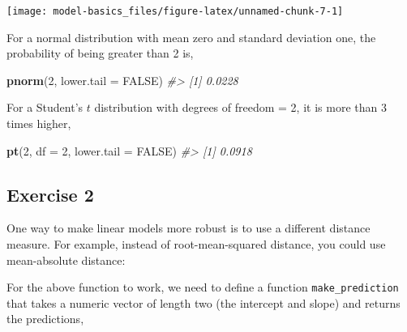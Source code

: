 \documentclass[]{book}
\newenvironment{Shaded}{\begin{snugshade}}{\end{snugshade}}
\newcommand{\CommentTok}[1]{\textcolor[rgb]{0.56,0.35,0.01}{\textit{#1}}}
\newcommand{\ControlFlowTok}[1]{\textcolor[rgb]{0.13,0.29,0.53}{\textbf{#1}}}
\newcommand{\DataTypeTok}[1]{\textcolor[rgb]{0.13,0.29,0.53}{#1}}
\newcommand{\DecValTok}[1]{\textcolor[rgb]{0.00,0.00,0.81}{#1}}
\newcommand{\KeywordTok}[1]{\textcolor[rgb]{0.13,0.29,0.53}{\textbf{#1}}}
\newcommand{\NormalTok}[1]{#1}
\newcommand{\OperatorTok}[1]{\textcolor[rgb]{0.81,0.36,0.00}{\textbf{#1}}}
\newcommand{\OtherTok}[1]{\textcolor[rgb]{0.56,0.35,0.01}{#1}}
\newcommand{\StringTok}[1]{\textcolor[rgb]{0.31,0.60,0.02}{#1}}
\theoremstyle{definition}
\theoremstyle{definition}
\theoremstyle{definition}
\theoremstyle{remark}
\begin{document}
\begin{center}\texttt{[image: model-basics\_files/figure-latex/unnamed-chunk-7-1]} \end{center}

For a normal distribution with mean zero and standard deviation one, the
probability of being greater than 2 is,

\begin{Shaded}
\begin{Highlighting}[]
\KeywordTok{pnorm}\NormalTok{(}\DecValTok{2}\NormalTok{, }\DataTypeTok{lower.tail =} \OtherTok{FALSE}\NormalTok{)}
\CommentTok{#> [1] 0.0228}
\end{Highlighting}
\end{Shaded}

For a Student's \(t\) distribution with degrees of freedom = 2, it is
more than 3 times higher,

\begin{Shaded}
\begin{Highlighting}[]
\KeywordTok{pt}\NormalTok{(}\DecValTok{2}\NormalTok{, }\DataTypeTok{df =} \DecValTok{2}\NormalTok{, }\DataTypeTok{lower.tail =} \OtherTok{FALSE}\NormalTok{)}
\CommentTok{#> [1] 0.0918}
\end{Highlighting}
\end{Shaded}

\hypertarget{exercise-2-56}{%
\subsection{Exercise 2}\label{exercise-2-56}}

One way to make linear models more robust is to use a different distance
measure. For example, instead of root-mean-squared distance, you could
use mean-absolute distance:

\begin{Shaded}
\end{Shaded}

For the above function to work, we need to define a function
\texttt{make\_prediction} that takes a numeric vector of length two (the
intercept and slope) and returns the predictions,
\end{document}
